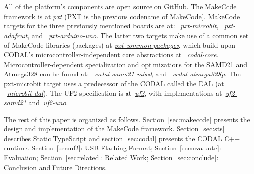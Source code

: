 All of the platform's components are open source on GitHub. The MakeCode framework is at \emph{\href{https://github.com/microsoft/pxt}{pxt}}
(PXT is the previous codename of MakeCode). MakeCode targets for the three previously mentioned boards are at: 
~\emph{\href{https://github.com/microsoft/pxt-microbit}{pxt-microbit}}, 
~\emph{\href{https://github.com/microsoft/pxt-adafruit}{pxt-adafruit}}, and
~\emph{\href{https://github.com/microsoft/pxt-arduino-uno}{pxt-arduino-uno}}.
The latter two targets make use of a common set of MakeCode libraries (packages) at
\emph{\href{https://github.com/microsoft/pxt-common-packages}{pxt-common-packages}},
which build upon CODAL's microcontroller-independent core abstractions at
~\emph{\href{https://github.com/lancaster-university/codal-core}{codal-core}}.  
Microcontroller-dependent specialization and optimizations for the SAMD21
and Atmega328 can be found at:
~\emph{\href{https://github.com/lancaster-university/codal-samd21-mbed}{codal-samd21-mbed}}, and
~\emph{\href{https://github.com/lancaster-university/codal-atmega328p}{codal-atmega328p}}.
The pxt-microbit target uses a predecessor of the CODAL called the DAL (at
~\emph{\href{https://github.com/lancaster-university/microbit-dal}{microbit-dal}}).
The UF2 specification is at~\emph{\href{https://github.com/microsoft/uf2}{uf2}},
with implementations at~\emph{\href{https://github.com/microsoft/uf2-samd21}{uf2-samd21}}
and~\emph{\href{https://github.com/mmoskal/uf2-uno}{uf2-uno}}.

The rest of this paper is organized as follows. Section~\ref{sec:makecode} presents the design and implementation of the MakeCode framework. 
Section~\ref{sec:sts} describes Static TypeScript and section~\ref{sec:codal} presents the CODAL C++ runtime. 
Section~\ref{sec:uf2}: USB Flashing Format;
Section~\ref{sec:evaluate}: Evaluation;
Section~\ref{sec:related}: Related Work;
Section~\ref{sec:conclude}: Conclusion and Future Directions. 

